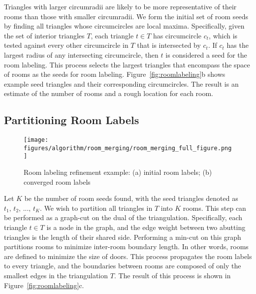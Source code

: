 \documentclass[a4paper,twoside]{article}
\begin{document}
Triangles with larger circumradii are likely to be more representative of their rooms than those with smaller circumradii.  We form the initial set of room seeds by finding all triangles whose circumcircles are local maxima.  Specifically, given the set of interior triangles $T$, each triangle $t \in T$ has circumcircle $c_t$, which is tested against every other circumcircle in $T$ that is intersected by $c_t$.  If $c_t$ has the largest radius of any intersecting circumcircle, then $t$ is considered a seed for the room labeling.  This process selects the largest triangles that encompass the space of rooms as the seeds for room labeling.  Figure~\ref{fig:roomlabeling}b shows example seed triangles and their corresponding circumcircles.  The result is an estimate of the number of rooms and a rough location for each room.

\subsection{Partitioning Room Labels}

\begin{figure*}[t]
  \centering
  \texttt{[image: figures/algorithm/room\_merging/room\_merging\_full\_figure.png]}
  \caption{Room labeling refinement example:  (a) initial room labels; (b) converged room labels}
  \label{fig:roommerging}
\end{figure*}

Let $K$ be the number of room seeds found, with the seed triangles denoted as $t_1,\,t_2,\,...,\,t_K$.  We wish to partition all triangles in $T$ into $K$ rooms.  This step can be performed as a graph-cut on the dual of the triangulation.  Specifically, each triangle $t \in T$ is a node in the graph, and the edge weight between two abutting triangles is the length of their shared side.  Performing a min-cut on this graph partitions rooms to minimize inter-room boundary length.  In other words, rooms are defined to minimize the size of doors.  This process propagates the room labels to every triangle, and the boundaries between rooms are composed of only the smallest edges in the triangulation $T$.  The result of this process is shown in Figure~\ref{fig:roomlabeling}c.

\end{document}
